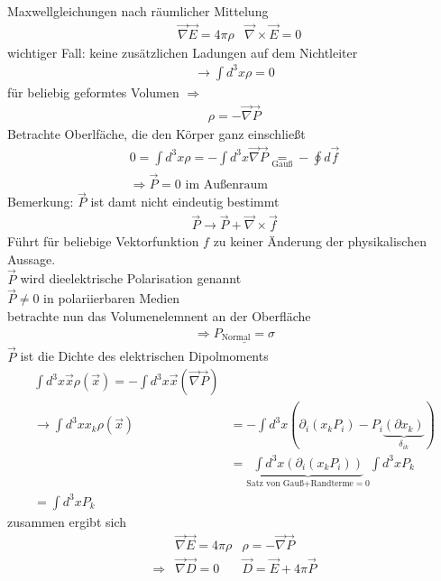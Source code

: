 \documentclass[a4paper]{article}
\begin{document}
Maxwellgleichungen nach räumlicher Mittelung
\begin{align}
&\vec{\nabla}\vec{E}=4\pi\rho&\vec{\nabla}\times\vec{E}=0 
\end{align}
wichtiger Fall: keine zusätzlichen Ladungen auf dem Nichtleiter
\begin{align}
\rightarrow \int d^3x \rho =0
\end{align}
für beliebig geformtes Volumen $\Rightarrow$
\begin{align}
\rho=-\vec{\nabla}\vec{P}
\end{align}
Betrachte Oberlfäche, die den Körper ganz einschließt
 \begin{align}
 0=\int d^3x\rho=-\int d^3x \vec{\nabla}\vec{P}\underset{\text{Gauß}}{=}-\oint
 d\vec{f}\\
 \Rightarrow
 \vec{P}=0 \text{ im Außenraum}
 \end{align}
Bemerkung: $\vec{P}$ ist damt nicht eindeutig bestimmt
\begin{align}
\vec{P}\rightarrow \vec{P}+\vec{\nabla}\times\vec{f} 
\end{align}
Führt für beliebige Vektorfunktion $f$ zu keiner Änderung der physikalischen
Aussage. \\
$\vec{P}$ wird dieelektrische Polarisation genannt\\
$\vec{P}\neq0$ in polariierbaren Medien\\
betrachte nun das Volumenelemnent an der Oberfläche
\begin{align}
\Rightarrow \underline{P_{\text{Normal}}=\sigma}
\end{align} 
$\vec{P}$ ist die Dichte des elektrischen Dipolmoments
\begin{align}
\int d^3x \vec{x}\rho(\vec{x})=-\int d^3x \vec{x}(\vec{\nabla}\vec{P})\\
\rightarrow \int d^3\!x x_k\rho(\vec{x})&=-\int d^3x
\left(\partial_i(x_kP_i)-P_i\underbrace{(\partial x_k)}_{\delta_{ik}}\right)\\
&=\underbrace{\int d^3x\left(\partial_i(x_kP_i)\right)}_{\text{Satz von
Gauß+Randterme}=0} \int d^3x P_k\\
=\int d^3x P_k
\end{align}
zusammen ergibt sich
\begin{align}
&\vec{\nabla}\vec{E}=4\pi\rho &\rho=-\vec{\nabla}\vec{P}\\
\Rightarrow &\vec{\nabla}\vec{D}=0 & \vec{D}=\vec{E}+4\pi\vec{P}
\end{align}
\end{document}
